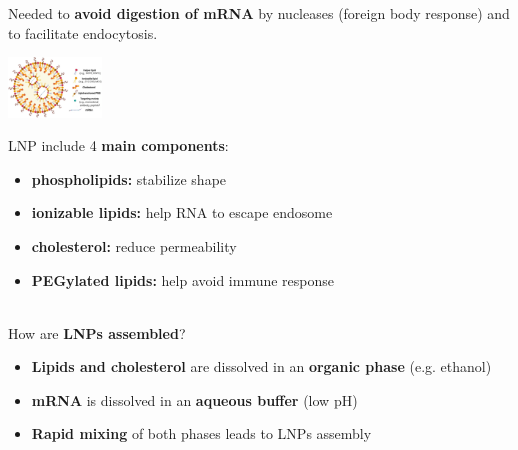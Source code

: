 Needed to \textbf{avoid digestion of mRNA}
by nucleases (foreign body response) and to
facilitate endocytosis.\\

\begin{minipage}
    {0.3\linewidth}
    \includegraphics[width=25mm]{src/Images/lnp.png}
\end{minipage}
\begin{minipage}
    {0.7\linewidth}
LNP include 4 \textbf{main components}:
    \begin{itemize}
        \item \textbf{phospholipids:} stabilize shape
        \item \textbf{ionizable lipids:} help RNA to escape endosome
        \item \textbf{cholesterol:} reduce permeability
        \item \textbf{PEGylated lipids:} help avoid immune response
    \end{itemize}
\end{minipage}\\

How are \textbf{LNPs assembled}?
\begin{itemize}
    \item \textbf{Lipids and cholesterol} are dissolved in an \textbf{organic phase} (e.g. ethanol)
    \item \textbf{mRNA} is dissolved in an \textbf{aqueous buffer} (low pH)
    \item \textbf{Rapid mixing} of both phases leads to LNPs assembly
\end{itemize}